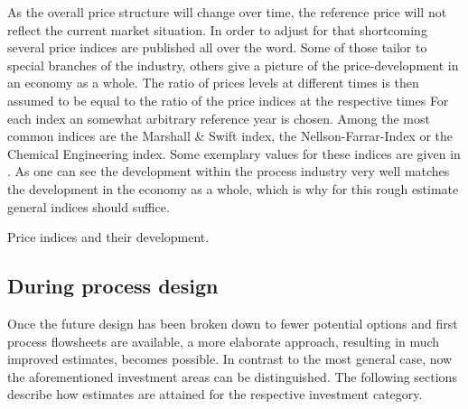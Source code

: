         As the overall price structure will change over time, the reference price will not reflect the current
        market situation. In order to adjust for that shortcoming several price indices are published
        all over the word. Some of those tailor to special branches of the industry, others give a picture
        of the price-development in an economy as a whole. The ratio of prices levels at different times
        is then assumed to be equal to the ratio of the price indices at the respective times
        For each index an somewhat arbitrary reference year is chosen. Among the most common indices are the
        Marshall \& Swift index, the Nellson-Farrar-Index or the Chemical Engineering index. Some exemplary
        values for these indices are given in . As one can see the development within the
        process industry very well matches the development in the economy as a whole, which is why for this rough
        estimate general indices should suffice.

        \begin{table}
        	\center
        	
        	\caption{Price indices and their development.\cite{Coulson.1999}}
        	\label{tab:PriceIndices}
        \end{table}

    \subsection{During process design}
        Once the future design has been broken down to fewer potential options and first process
        flowsheets are available, a more elaborate approach, resulting in much improved estimates, becomes possible.
        In contrast to the most general case, now the aforementioned investment areas can be distinguished.
        The following sections describe how estimates are attained for the respective investment category.

